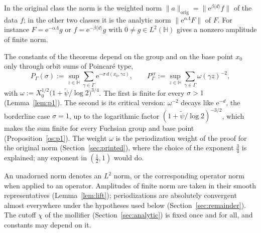 \documentclass[twoside,10pt]{article}
\numberwithin{equation}{section}
\theoremstyle{slbody}
\theoremstyle{remark}
\newcommand{\Hb}{\mathbb{H}}
\newcommand{\norm}[1]{\lVert #1\rVert}
\newcommand{\ue}{\mathrm{e}}
\newcommand{\pcNorm}[1]{\norm{#1}_{\mathrm{orig}}}
\begin{document}
In the original class the norm is the weighted norm $\pcNorm a=\norm{\ue^{\beta\langle d\rangle}f}$ of the data $f$; in the
other two classes it is the analytic norm $\norm{\ue^{\alpha\Lambda}F}$ of $F$. For instance
$F=\ue^{-\alpha\Lambda}g$ or $f=\ue^{-\beta\langle d\rangle}g$ with $0\ne g\in L^2(\Hb)$ gives a nonzero amplitude of finite norm.

The constants of the theorems depend on the group and on the base point $x_0$ only through orbit sums of Poincar\'e type,
\[
  P_\Gamma(\sigma):=\sup_{z\in\Hb}\sum_{\gamma\in\Gamma}\ue^{-\sigma\,d(x_0,\gamma z)},\qquad
  P^{\mathrm{cr}}_\Gamma:=\sup_{z\in\Hb}\sum_{\gamma\in\Gamma}\omega(\gamma z)^{-2},
\]
with $\omega:=X_0^{1/2}\bigl(1+\tilde\psi/\log2\bigr)^{3/4}$. The first is finite for every $\sigma>1$ (Lemma~\ref{lem:p1}). The second is its critical version: $\omega^{-2}$ decays like
$\ue^{-d}$, the borderline case $\sigma=1$, up to the logarithmic factor $(1+\tilde\psi/\log2)^{-3/2}$, which makes the sum finite for
every Fuchsian group and base point (Proposition~\ref{os:p1}). The weight $\omega$ is the periodization weight of the proof for the
original norm (Section~\ref{sec:printed}), where the choice of the exponent $\tfrac34$ is explained; any exponent in $(\tfrac12,1)$ would do.

An unadorned norm denotes an $L^2$ norm, or the corresponding operator norm when applied to an operator.
Amplitudes of finite norm are taken in their smooth representatives (Lemma~\ref{lem:lift}); periodizations are
absolutely convergent almost everywhere under the hypotheses used below (Section~\ref{sec:remainder}). The cutoff $\chi$
of the mollifier (Section~\ref{sec:analytic}) is fixed once and for all, and constants may depend on it.
\end{document}

